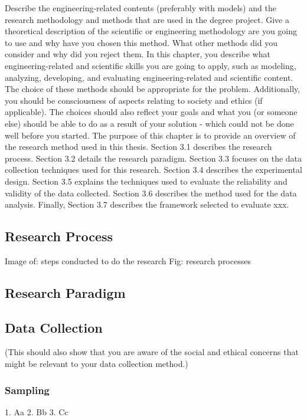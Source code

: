 \documentclass[a4paper,12pt,twocolumn]{article}
\numberwithin{figure}{section}
\numberwithin{table}{section}
\begin{document}
Describe the engineering-related contents (preferably with models) and the research methodology
and methods that are used in the degree project.
Give a theoretical description of the scientific or engineering methodology are you going to use
and why have you chosen this method. What other methods did you consider and why did you reject
them.
In this chapter, you describe what engineering-related and scientific skills you are going to
apply, such as modeling, analyzing, developing, and evaluating engineering-related and scientific
content. The choice of these methods should be appropriate for the problem. Additionally, you
should be consciousness of aspects relating to society and ethics (if applicable). The choices should
also reflect your goals and what you (or someone else) should be able to do as a result of your
solution - which could not be done well before you started.
The purpose of this chapter is to provide an overview of the research method used in this thesis.
Section 3.1 describes the research process. Section 3.2 details the research paradigm. Section 3.3
focuses on the data collection techniques used for this research. Section 3.4 describes the
experimental design. Section 3.5 explains the techniques used to evaluate the reliability and validity
of the data collected. Section 3.6 describes the method used for the data analysis. Finally, Section 3.7
describes the framework selected to evaluate xxx.

\subsection{Research Process}
Image of: steps conducted to do the research 
Fig: research processes


\subsection{Research Paradigm}

\subsection{Data Collection}
(This should also show that you are aware of the social and ethical concerns that might be relevant
to your data collection method.)

\subsubsection{Sampling}
1. Aa
2. Bb
3. Cc
\end{document}
